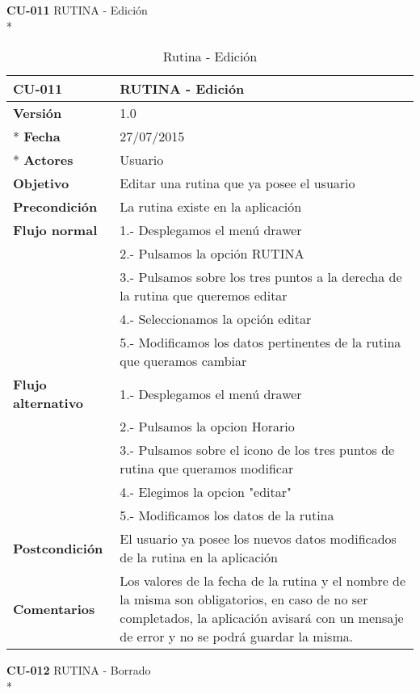 \documentclass[../pfc.tex]{subfiles}
\begin{document}
		
	\textbf{CU-011}	RUTINA - Edición\\*
		
		\begin{table}[H]
			\centering
			\begin{tabular}[t]{|p{3cm}|p{9.5cm}|}
				\hline \textbf{CU-011} & \textbf{RUTINA - Edición} \\*
				\hline\hline \textbf{Versión} & 1.0 \\ *
				\hline\hline \textbf{Fecha} & 27/07/2015 \\ *
				\hline\textbf{Actores} 	& Usuario\\*
				\hline \textbf{Objetivo} & Editar una rutina que ya posee el usuario\\* 			
				\hline \textbf{Precondición} & La rutina existe en la aplicación\\* 
				\hline \textbf{Flujo normal} & 1.- Desplegamos el menú drawer \\* 
				& 2.- Pulsamos la opción RUTINA\\*	
				& 3.- Pulsamos sobre los tres puntos a la derecha de la rutina que queremos editar\\*	
				& 4.- Seleccionamos la opción editar\\*	
				& 5.- Modificamos los datos pertinentes de la rutina que queramos cambiar\\*	
				\hline \textbf{Flujo alternativo} & 1.- Desplegamos el menú drawer \\* 
				& 2.- Pulsamos la opcion Horario \\*	
				& 3.- Pulsamos sobre el icono de los tres puntos de rutina que queramos modificar \\*	
				& 4.- Elegimos la opcion "editar"\\*	
				& 5.- Modificamos los datos de la rutina\\*	
				\hline \textbf{Postcondición} & El usuario ya posee los nuevos datos modificados de la rutina en la aplicación \\* 
				\hline \textbf{Comentarios}   & Los valores de la fecha de la rutina y el nombre de la misma son obligatorios, en caso de no ser completados, la aplicación avisará con un mensaje de error y no se podrá guardar la misma.\\*
				\hline
			\end{tabular}
			\caption{Rutina - Edición}
			\label{tabla:caso011}
		\end{table}
		
		
		
	\textbf{CU-012}	RUTINA - Borrado\\*
		
\end{document}
